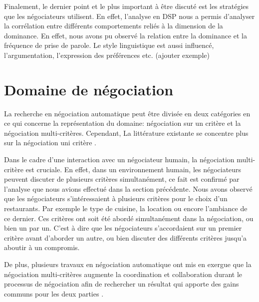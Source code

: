 		 Finalement, le dernier point et le plus important à être discuté est les stratégies que les négociateurs utilisent. En effet, l'analyse en DSP nous a permis d'analyser la corrélation entre différents comportements reliés à la dimension de la dominance. En effet, nous avons pu observé la relation entre la dominance et la fréquence de prise de parole. Le style linguistique est aussi influencé, l'argumentation, l'expression des préférences etc. 
		 (ajouter exemple)
		 
		  
		
	

\section{Domaine de négociation}



	La recherche en négociation automatique peut être divisée en deux catégories en ce qui concerne la représentation du domaine: négociation sur un critère et la négociation multi-critères. Cependant, La littérature existante se concentre plus sur la négociation uni critère \cite{lai2008decentralized,lai2004literature}. 
	
	Dans le cadre d'une interaction avec un négociateur humain, la négociation multi-critère est cruciale. En effet, dans un environnement humain, les négociateurs peuvent discuter de plusieurs critères simultanément, ce fait est confirmé par l'analyse que nous avions effectué dans la section précédente.  Nous avons observé que les négociateurs s'intéressaient à plusieurs critères pour le choix d'un restaurants. Par exemple le type de cuisine, la location ou encore l'ambiance de ce dernier. Ces critères ont soit été abordé simultanément dans la négociation, ou bien un par un. C'est à dire que les négociateurs s'accordaient sur un premier critère avant d'aborder un autre, ou bien discuter des différents critères jusqu'a aboutir à un compromis.
	
	De plus, plusieurs travaux en négociation automatique ont mis en exergue que la négociation multi-critères augmente la coordination et collaboration durant le processus de négociation afin de rechercher un résultat qui apporte des gains communs pour les deux parties \cite{jonker2007agent,lai2008decentralized,lai2004literature} . 

